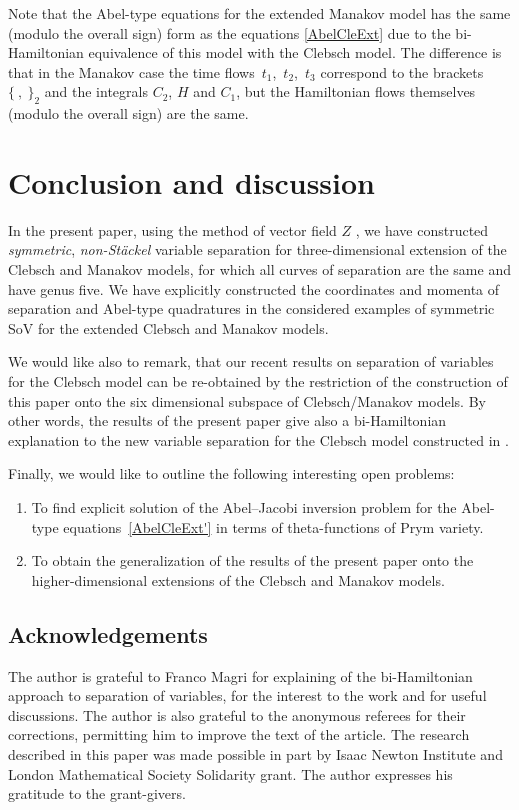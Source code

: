\documentclass[10pt,a4paper]{amsart}
\numberwithin{equation}{section}
\begin{document}
\begin{Remark}
 Note that the Abel-type equations for the extended Manakov model has the same (modulo the overall sign) form as the equations \eqref{AbelCleExt} due to the bi-Hamiltonian equivalence of this model with the Clebsch model. The difference is that in the Manakov case the time flows~$t_1$,~$t_2$,~$t_3$ correspond to the brackets $\{\ ,\ \}_2$ and the integrals $C_2$, $H$ and $C_1$, but the Hamiltonian flows themselves (modulo the overall sign) are the same.
\end{Remark}


\section{Conclusion and discussion}\label{sec6}
In the present paper,
using the method of vector field $Z$ \cite{MFP}, we have constructed {\it symmetric}, {\it non-St\"ackel} variable separation for three-dimensional extension of the Clebsch and Manakov models, for which all curves of separation
 are the same and have genus five.
 We have explicitly constructed the coordinates and momenta of separation %
 and Abel-type quadratures in the considered examples of symmetric SoV for the extended Clebsch and Manakov models.

 We would like also to remark, that our recent results \cite{SkrJGP2025} on separation of variables for the Clebsch model can be re-obtained by the restriction of the construction of this paper onto the six dimensional subspace of Clebsch/Manakov models. By other words, the results of the present paper give also a bi-Hamiltonian explanation to the new variable separation for the Clebsch model constructed in \cite{SkrJGP2025}.

Finally, we would like to outline the following interesting open problems:
\begin{enumerate}\itemsep=0pt
\item[(1)] To find explicit solution of the Abel--Jacobi inversion problem for the Abel-type equations~\eqref{AbelCleExt'} in terms of theta-functions of Prym variety.
 \item[(2)] To obtain the generalization of the results of the present paper onto the higher-dimensional
 extensions of the Clebsch and Manakov models.
 \end{enumerate}

\subsection*{Acknowledgements} The author is grateful to Franco Magri for explaining of the bi-Hamiltonian approach to separation of variables, for the interest to the work and for useful discussions. The author is also grateful to the anonymous referees for their corrections, permitting him to improve the text of the article. The research described in this paper was made possible in part by Isaac Newton Institute and London Mathematical Society Solidarity grant. The author expresses his gratitude to the grant-givers.
\end{document}

